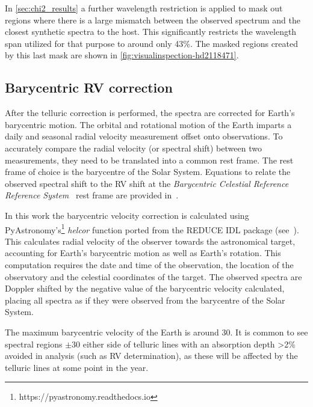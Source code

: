 In \cref{sec:chi2_results} a further wavelength restriction is applied to mask out regions where there is a large mismatch between the observed spectrum and the closest synthetic spectra to the host.
This significantly restricts the wavelength span utilized for that purpose to around only 43\%.
The masked regions created by this last mask are shown in \cref{fig:visualinspection-hd2118471}.


\subsection{Barycentric RV correction}
\label{subsec:barycentriccorrection}
After the telluric correction is performed, the spectra are corrected for Earth's barycentric motion.
The orbital and rotational motion of the Earth imparts a daily and seasonal radial velocity measurement offset onto observations.
To accurately compare the radial velocity (or spectral shift) between two measurements, they need to be translated into a common rest frame.
The rest frame of choice is the barycentre of the Solar System.
Equations to relate the observed spectral shift to the RV shift at the \textit{Barycentric Celestial Reference Reference System}~\citep{rickman_transactions_2001} rest frame are provided in~\citep{lindegren_fundamental_2003}.

In this work the barycentric velocity correction is calculated using PyAstronomy's\footnote{https://pyastronomy.readthedocs.io} \emph{helcor} function ported from the REDUCE IDL package (see~\citet[][]{piskunov_new_2002}).
This calculates radial velocity of the observer towards the astronomical target, accounting for Earth's barycentric motion as well as Earth's rotation.
This computation requires the date and time of the observation, the location of the observatory and the celestial coordinates of the target.
The observed spectra are Doppler shifted by the negative value of the barycentric velocity calculated, placing all spectra as if they were observed from the barycentre of the Solar System.

The maximum barycentric velocity of the Earth is around 30\kmps{}.
It is common to see spectral regions $\pm30$\kmps{} either side of telluric lines with an absorption depth >2\% avoided in analysis (such as RV determination), as these will be affected by the telluric lines at some point in the year.
